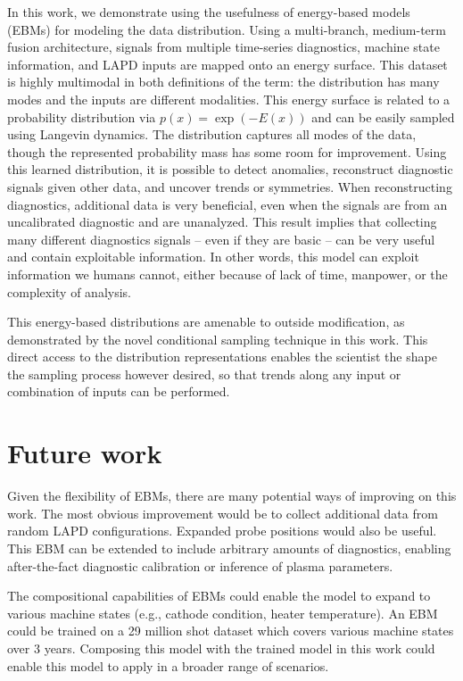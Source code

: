 In this work, we demonstrate using the usefulness of energy-based models (EBMs) for modeling the data distribution. Using a multi-branch, medium-term fusion architecture, signals from multiple time-series diagnostics, machine state information, and LAPD inputs are mapped onto an energy surface. This dataset is highly multimodal in both definitions of the term: the distribution has many modes and the inputs are different modalities. This energy surface is related to a probability distribution via $p(x) = \exp(-E(x))$ and can be easily sampled using Langevin dynamics. The distribution captures all modes of the data, though the represented probability mass has some room for improvement. Using this learned distribution, it is possible to detect anomalies, reconstruct diagnostic signals given other data, and uncover trends or symmetries. When reconstructing diagnostics, additional data is very beneficial, even when the signals are from an uncalibrated diagnostic and are unanalyzed. This result implies that collecting many different diagnostics signals -- even if they are basic -- can be very useful and contain exploitable information. In other words, this model can exploit information we humans cannot, either because of lack of time, manpower, or the complexity of analysis.

This energy-based distributions are amenable to outside modification, as demonstrated by the novel conditional sampling technique in this work. This direct access to the distribution representations enables the scientist the shape the sampling process however desired, so that trends along any input or combination of inputs can be performed.

\section{Future work}
Given the flexibility of EBMs, there are many potential ways of improving on this work. The most obvious improvement would be to collect additional data from random LAPD configurations. Expanded probe positions would also be useful. This EBM can be extended to include arbitrary amounts of diagnostics, enabling after-the-fact diagnostic calibration or inference of plasma parameters. 

The compositional capabilities of EBMs could enable the model to expand to various machine states (e.g., cathode condition, heater temperature). An EBM could be trained on a 29 million shot dataset which covers various machine states over 3 years. Composing this model with the trained model in this work could enable this model to apply in a broader range of scenarios.

